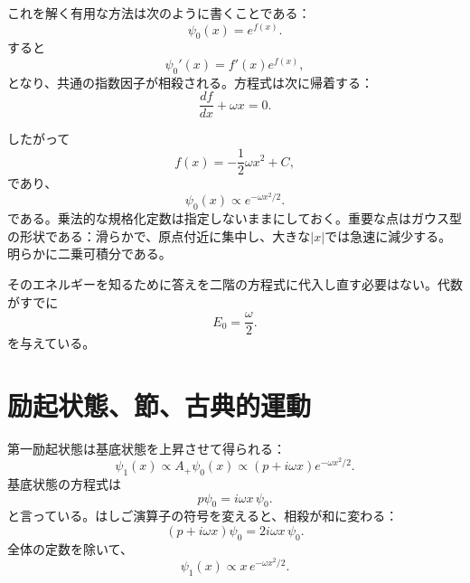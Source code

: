 \begin{classroomqa}
\end{classroomqa}

これを解く有用な方法は次のように書くことである：
\begin{equation}
\psi_{0}(x)=e^{f(x)}.
\end{equation}
すると
\[
\psi_{0}'(x)=f'(x)e^{f(x)},
\]
となり、共通の指数因子が相殺される。方程式は次に帰着する：
\begin{equation}
\frac{df}{dx}+\omega x=0.
\end{equation}

\begin{classroomqa}
\end{classroomqa}

したがって
\begin{equation}
f(x)=-\frac12\omega x^{2}+C,
\end{equation}
であり、
\begin{equation}
\psi_{0}(x)\propto e^{-\omega x^{2}/2}.
\end{equation}
である。乗法的な規格化定数は指定しないままにしておく。重要な点はガウス型の形状である：滑らかで、原点付近に集中し、大きな\(\lvert x\rvert\)では急速に減少する。明らかに二乗可積分である。

そのエネルギーを知るために答えを二階の方程式に代入し直す必要はない。代数がすでに
\begin{equation}
E_{0}=\frac{\omega}{2}.
\end{equation}
を与えている。

\section{励起状態、節、古典的運動}

第一励起状態は基底状態を上昇させて得られる：
\begin{equation}
\psi_{1}(x)\propto A_{+}\psi_{0}(x)
\propto(p+i\omega x)e^{-\omega x^{2}/2}.
\end{equation}
基底状態の方程式は
\[
p\psi_{0}=i\omega x\,\psi_{0}.
\]
と言っている。はしご演算子の符号を変えると、相殺が和に変わる：
\begin{equation}
(p+i\omega x)\psi_{0}
=2i\omega x\,\psi_{0}.
\end{equation}
全体の定数を除いて、
\begin{equation}
\psi_{1}(x)\propto x\,e^{-\omega x^{2}/2}.
\end{equation}

